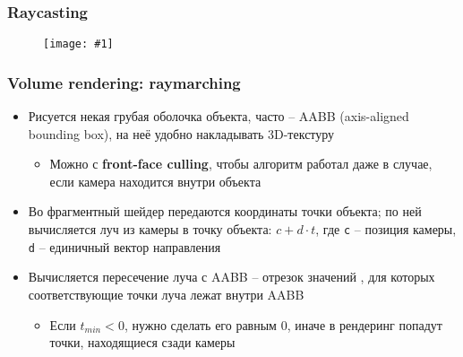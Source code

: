 \documentclass[10pt]{beamer}
\newcommand{\slideimage}[1]{
  \begin{figure}
    \begin{adjustbox}{width=\textwidth, totalheight=\textheight-2\baselineskip-2\baselineskip,keepaspectratio}
      \texttt{[image: \#1]}
    \end{adjustbox}
  \end{figure}
}
\begin{document}
\begin{frame}[fragile]
\frametitle{Raycasting}
\slideimage{raycasting.png}
\end{frame}


\begin{frame}[fragile]
\frametitle{Volume rendering: raymarching}
\begin{itemize}
\item Рисуется некая грубая оболочка объекта, часто -- AABB (axis-aligned bounding box), на неё удобно накладывать 3D-текстуру
\begin{itemize}
\item Можно с \textbf{front-face culling}, чтобы алгоритм работал даже в случае, если камера находится внутри объекта
\end{itemize}
\pause
\item Во фрагментный шейдер передаются координаты точки объекта; по ней вычисляется луч из камеры в точку объекта: \begin{math}c + d\cdot t\end{math}, где \verb|c| -- позиция камеры, \verb|d| -- единичный вектор направления
\pause
\item Вычисляется пересечение луча с AABB -- отрезок значений \begin{math}[t_{min}, t_{max}]\end{math}, для которых соответствующие точки луча лежат внутри AABB
\begin{itemize}
\item Если \begin{math}t_{min} < 0\end{math}, нужно сделать его равным 0, иначе в рендеринг попадут точки, находящиеся сзади камеры
\end{itemize}
\end{itemize}
\end{frame}
\end{document}
